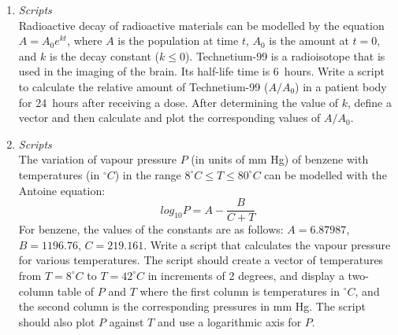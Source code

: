 \begin{enumerate}
\item \textit{Scripts}\\
Radioactive decay of radioactive materials can be modelled by the equation $A=A_0e^{kt}$, where $A$ is the population at time $t$, $A_0$ is the amount at $t=0$, and $k$ is the decay constant ($k\leq 0$). Technetium-99 is a radioisotope that is used in the imaging of the brain. Its half-life time is 6~hours. Write a script to calculate the relative amount of Technetium-99 ($A/A_0$) in a patient body for 24~hours after receiving a dose. After determining the value of $k$, define a vector  and then calculate and plot the corresponding values of $A/A_0$.

\item \textit{Scripts}\\
The variation of vapour pressure $P$ (in units of mm Hg) of benzene with temperatures (in $^\circ C$) in the range $8^\circ C \leq T \leq 80^\circ C$ can be modelled with the Antoine equation:
\begin{equation*}
log_{10}P=A - \frac{B}{C+T}
\end{equation*}
For benzene, the values of the constants are as follows: $A = 6.87987$, $B = 1196.76$, $C = 219.161$. Write a script that calculates the vapour pressure for various temperatures. The script should create a vector of temperatures from $T = 8^\circ C$ to $T = 42^\circ C$ in increments of 2 degrees, and display a two-column table of $P$ and $T$ where the first column is temperatures in $^\circ C$, and the second column is the corresponding pressures in mm Hg. The script should also plot $P$ against $T$ and use a logarithmic axis for $P$.


\end{enumerate}
